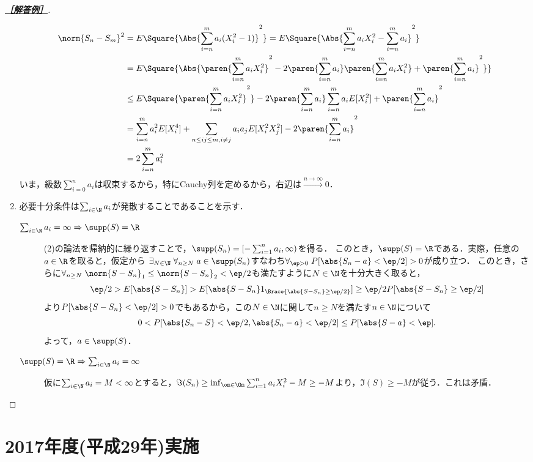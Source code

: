 \documentclass[uplatex,dvipdfmx]{jsarticle}
\begin{document}
\begin{proof}[\textbf{\underline{［解答例］}}]
\begin{enumerate}
        \begin{align*}
            \norm{S_n-S_m}^2&=E\Square{\Abs{\sum^m_{i=n}a_i(X_i^2-1)}^2}=E\Square{\Abs{\sum^m_{i=n}a_iX_i^2-\sum^m_{i=n}a_i}^2}\\
            &=E\Square{\Abs{\paren{\sum^m_{i=n}a_iX_i^2}^2-2\paren{\sum^m_{i=n}a_i}\paren{\sum^m_{i=n}a_iX_i^2}+\paren{\sum^m_{i=n}a_i}^2}}\\
            &\le E\Square{\paren{\sum^m_{i=n}a_iX_i^2}^2}-2\paren{\sum^m_{i=n}a_i}\sum_{i=n}^ma_iE[X_i^2]+\paren{\sum^m_{i=n}a_i}^2\\
            &=\sum^m_{i=n}a_i^2E[X_i^4]+\sum_{n\le ij\le m,i\ne j}a_ia_jE[X_i^2X_j^2]-2\paren{\sum^m_{i=n}a_i}^2\\
            &=2\sum_{i=n}^ma_i^2
        \end{align*}
        いま，級数$\sum^n_{i=0}a_i$は収束するから，特にCauchy列を定めるから，右辺は$\xrightarrow{n\to\infty}0$．
        \item 必要十分条件は$\sum_{i\in\N}a_i$が発散することであることを示す．
        \begin{description}
            \item[$\sum_{i\in\N}a_i=\infty\Rightarrow\supp(S)=\R$] (2)の論法を帰納的に繰り返すことで，$\supp(S_n)=\left[-\sum_{i=1}^na_i,\infty\right)$を得る．
            このとき，$\supp(S)=\R$である．実際，任意の$a\in\R$を取ると，仮定から
            $\exists_{N\in\N}\;\forall_{n\ge N}\;a\in\supp(S_n)$すなわち$\forall_{\ep>0}\;P[\abs{S_n-a}<\ep/2]>0$が成り立つ．
            このとき，さらに$\forall_{n\ge N}\;\norm{S-S_n}_1\le\norm{S-S_n}_2<\ep/2$も満たすように$N\in\N$を十分大きく取ると，
            \[\ep/2>E[\abs{S-S_n}]>E[\abs{S-S_n}1_{\Brace{\abs{S-S_n}\ge\ep/2}}]\ge\ep/2P[\abs{S-S_n}\ge\ep/2]\]
            より$P[\abs{S-S_n}<\ep/2]>0$でもあるから，この$N\in\N$に関して$n\ge N$を満たす$n\in\N$について
            \[0<P[\abs{S_n-S}<\ep/2,\abs{S_n-a}<\ep/2]\le P[\abs{S-a}<\ep].\]
            よって，$a\in\supp(S)$．
            \item[$\supp(S)=\R\Rightarrow\sum_{i\in\N}a_i=\infty$] 仮に$\sum_{i\in\N}a_i=M<\infty$とすると，$\Im(S_n)\ge\inf_{\om\in\Om}\sum_{i=1}^na_iX_i^2-M\ge-M$より，$\Im(S)\ge-M$が従う．これは矛盾．
        \end{description}
    \end{enumerate}
\end{proof}

\section{2017年度(平成29年)実施}
\end{document}
